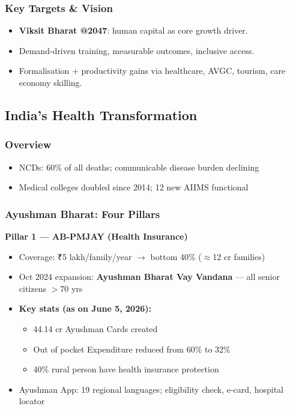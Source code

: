 \subsubsection*{Key Targets \& Vision}
\begin{itemize}
  \item \textbf{Viksit Bharat @2047}: human capital as core growth driver.
  \item Demand-driven training, measurable outcomes, inclusive access.
  \item Formalisation + productivity gains via healthcare, AVGC, tourism, care economy skilling.
\end{itemize}

\subsection{India's Health Transformation}

\subsubsection*{Overview}
\begin{itemize}
  \item NCDs: 60\% of all deaths; communicable disease burden declining
  \item Medical colleges doubled since 2014; 12 new AIIMS functional
\end{itemize}

\subsubsection*{Ayushman Bharat: Four Pillars}

\textbf{Pillar 1 — AB-PMJAY (Health Insurance)}
\begin{itemize}
  \item Coverage: ₹5 lakh/family/year $\rightarrow$ bottom 40\% ($\approx$12 cr families)
  \item Oct 2024 expansion: \textbf{Ayushman Bharat Vay Vandana} — all senior citizens $>$70 yrs
  \item \textbf{Key stats (as on June 5, 2026):}
    \begin{itemize}
      \item 44.14 cr Ayushman Cards created
      \item Out of pocket Expenditure reduced from 60\% to 32\%
      \item 40\% rural person have health insurance protection 
    \end{itemize}
  \item Ayushman App: 19 regional languages; eligibility check, e-card, hospital locator
\end{itemize}

